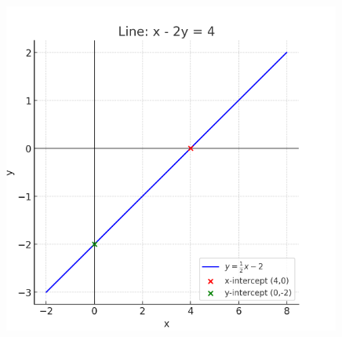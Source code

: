\documentclass[journal]{IEEEtran}
\begin{document}
\begin{figure}[H]
\begin{center}
\includegraphics[width=0.6\columnwidth]{figs/graphb.png}
\end{center}
\caption{}
\label{fig:Fig}
\end{figure}
\end{document}
